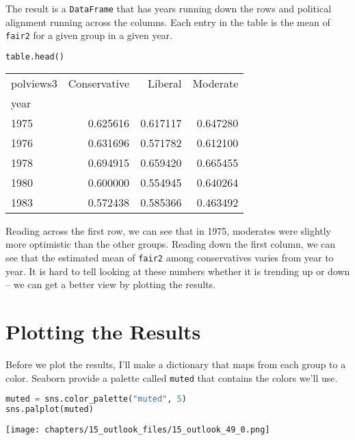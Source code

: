The result is a \passthrough{\lstinline!DataFrame!} that has years
running down the rows and political alignment running across the
columns. Each entry in the table is the mean of
\passthrough{\lstinline!fair2!} for a given group in a given year.

\begin{lstlisting}[language=Python,style=source]
table.head()
\end{lstlisting}

\begin{tabular}{lrrr}
\midrule
polviews3 & Conservative & Liberal & Moderate \\
year &  &  &  \\
\midrule
1975 & 0.625616 & 0.617117 & 0.647280 \\
1976 & 0.631696 & 0.571782 & 0.612100 \\
1978 & 0.694915 & 0.659420 & 0.665455 \\
1980 & 0.600000 & 0.554945 & 0.640264 \\
1983 & 0.572438 & 0.585366 & 0.463492 \\
\midrule
\end{tabular}

Reading across the first row, we can see that in 1975, moderates were
slightly more optimistic than the other groups. Reading down the first
column, we can see that the estimated mean of
\passthrough{\lstinline!fair2!} among conservatives varies from year to
year. It is hard to tell looking at these numbers whether it is trending
up or down -- we can get a better view by plotting the results.

\hypertarget{plotting-the-results}{%
\section{Plotting the Results}\label{plotting-the-results}}

Before we plot the results, I'll make a dictionary that maps from each
group to a color. Seaborn provide a palette called
\passthrough{\lstinline!muted!} that contains the colors we'll use.

\begin{lstlisting}[language=Python,style=source]
muted = sns.color_palette("muted", 5)
sns.palplot(muted)
\end{lstlisting}

\begin{center}
\texttt{[image: chapters/15\_outlook\_files/15\_outlook\_49\_0.png]}
\end{center}

